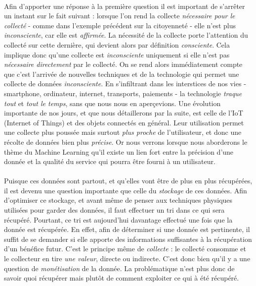 \paragraph{} Afin d'apporter une réponse à la première question il est important de s'arrêter un instant sur le fait
suivant : lorsque l'on rend la collecte \emph{nécessaire pour le collecté} - comme dans l'exemple précédent sur la
citoyenneté - elle n'est plus \emph{inconsciente}, car elle est \emph{affirmée}. La nécessité de la collecte porte
l'attention du collecté sur cette dernière, qui devient alors par définition \emph{consciente}. Cela
implique donc qu'une collecte est \emph{inconsciente} uniquement si elle n'est pas \emph{nécessaire directement}
par le collecté. On se rend alors immédiatement compte que c'est l'arrivée de nouvelles techniques et de la
technologie qui permet une collecte de données \emph{inconsciente}. En s'infiltrant dans les interstices de nos vies -
smartphone, ordinateur, internet, transports, paiements - la technologie \emph{traque tout} et \emph{tout le temps},
sans que nous nous en aperçevions. Une évolution importante de nos jours, et que nous détaillerons par la suite, est
celle de l'IoT (Internet of Things) et des objets connectés en général. Leur utilisation permet une collecte plus
poussée mais surtout \emph{plus proche} de l'utilisateur, et donc une récolte de données bien plus \emph{précise}. Or
nous verrons lorsque nous aborderons le thème du Machine Learning qu'il existe un lien fort entre la précision d'une
donnée et la qualité du service qui pourra être fourni à un utilisateur.

\paragraph{} Puisque ces données sont partout, et qu'elles vont être de plus en plus récupérées, il est devenu
une question importante que celle du \emph{stockage} de ces données. Afin d'optimiser ce stockage, et avant même de
penser aux techniques physiques utilisées pour garder des données, il faut effectuer un tri dans ce qui sera récupéré.
Pourtant, ce tri est aujourd'hui davantage effectué une fois que la donnée est récupérée. En effet, afin de déterminer
si une donnée est pertinente, il suffit de se demander si elle apporte des informations suffisantes à la récupération
d'un bénéfice futur. C'est le principe même de \emph{collecte} : le collecté consomme et le collecteur en tire \emph{
une valeur}, directe ou indirecte. C'est donc bien qu'il y a une question de \emph{monétisation} de la donnée. La
problématique n'est plus donc de savoir quoi récupérer mais plutôt de comment exploiter ce qui à été récupéré.

